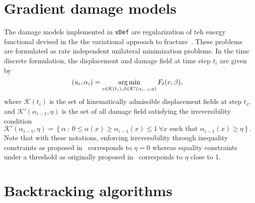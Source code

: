 \documentclass[10pt,oneside]{memoir}
\def\vDef{{\texttt{vDef}} }
\def\argmin{\qopname\relax m{arg\,min}}
\begin{document}
\section{Gradient damage models}
\label{sec:GradientDamageModels}
The damage models implemented in \vDef are regularization of teh energy functional devised in the the variational approach to fracture~\cite{Ambrosio-Tortorelli-1990,Ambrosio-Tortorelli-1992,Giacomini-2005,Sicsic-Marigo-2013a}. These problems are formulated as rate independent unilateral minimization problems. In the time discrete formulation, the displacement and damage field at time step $t_i$ are given by
\begin{equation}
	\label{eq:globMin}
	(u_i,\alpha_i) = \argmin_{v \in \mathcal{K}(t_i), \beta \in \mathcal{K}'(\alpha_{i-1},\eta)} F_\ell(v,\beta),
\end{equation}
where $\mathcal{K}(t_i)$ is the set of kinematically admissible displacement fields at step $t_i$, and $\mathcal{K}'(\alpha_{i-1},\eta)$ is the set of all damage field satisfying the irreversibility condition
$$
	\mathcal{K}'(\alpha_{i-1},\eta) = \left\{\alpha \ :\  0 \le \alpha(x) \ge \alpha_{i-1}(x) \le 1 \ \forall x \text{ such that } \alpha_{i-1}(x) \ge \eta\right\}.
$$
Note that with these notations, enforcing irreversibility through inequality constraints as proposed in~\cite{Giacomini-2005,Amor-Marigo-EtAl-2008a,Pham-Amor-EtAl-2011a} corresponds to $\eta = 0$ whereas equality constraints under a threshold as originally proposed in~\cite{Bourdin-Francfort-EtAl-2000a} corresponds to $\eta$ close to 1.

\section{Backtracking algorithms}
\label{sec:BT}
\end{document}
